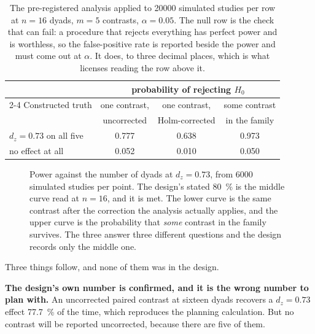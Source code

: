 \begin{table}[htbp]
  \centering
  \caption[The analysis on constructed data]{The pre-registered analysis
  applied to \num{20000} simulated studies per row at $n = 16$ dyads,
  $m = 5$ contrasts, $\alpha = \num{0.05}$. The null row is the check that
  can fail: a procedure that rejects everything has perfect power and is
  worthless, so the false-positive rate is reported beside the power and must
  come out at $\alpha$. It does, to three decimal places, which is what
  licenses reading the row above it.}
  \label{tab:pipeline-validation}
  \begin{tabular}{@{}lccc@{}}
    \toprule
    & \multicolumn{3}{c}{probability of rejecting $H_0$} \\
    \cmidrule(l){2-4}
    Constructed truth & one contrast, & one contrast, & some contrast \\
                      & uncorrected   & Holm-corrected & in the family \\
    \midrule
    $d_z = \num{0.73}$ on all five & \num{0.777} & \num{0.638} & \num{0.973} \\
    no effect at all               & \num{0.052} & \num{0.010} & \num{0.050} \\
    \bottomrule
  \end{tabular}
\end{table}

\begin{figure}[htbp]
  \centering
  
  \caption[Power against the number of dyads]{Power against the number of
  dyads at $d_z = \num{0.73}$, from \num{6000} simulated studies per point.
  The design's stated \SI{80}{\percent} is the middle curve read at
  $n = \num{16}$, and it is met. The lower curve is the same contrast after
  the correction the analysis actually applies, and the upper curve is the
  probability that \emph{some} contrast in the family survives. The three
  answer three different questions and the design records only the middle
  one.}
  \label{fig:power}
\end{figure}

Three things follow, and none of them was in the design.

\textbf{The design's own number is confirmed, and it is the wrong number to
plan with.} An uncorrected paired contrast at sixteen dyads recovers a
$d_z = \num{0.73}$ effect \SI{77.7}{\percent} of the time, which reproduces
the planning calculation. But no contrast will be reported uncorrected,
because there are five of them.

